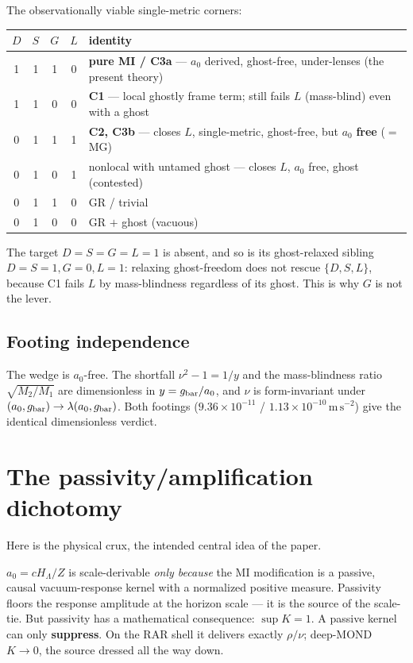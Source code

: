 \documentclass[11pt]{article}
\newcommand{\ms}{\mathrm{m\,s^{-2}}}
\newcommand{\gbar}{g_{\rm bar}}
\begin{document}
The observationally viable single-metric corners:
\begin{center}
\begin{tabular}{ccccl}
\toprule
$D$ & $S$ & $G$ & $L$ & identity\\
\midrule
1 & 1 & 1 & 0 & \textbf{pure MI / C3a} --- $a_0$ derived, ghost-free, under-lenses (the present theory)\\
1 & 1 & 0 & 0 & \textbf{C1} --- local ghostly frame term; still fails $L$ (mass-blind) even with a ghost\\
0 & 1 & 1 & 1 & \textbf{C2, C3b} --- closes $L$, single-metric, ghost-free, but $a_0$ \textbf{free} ($=$MG)\\
0 & 1 & 0 & 1 & nonlocal with untamed ghost --- closes $L$, $a_0$ free, ghost (contested)\\
0 & 1 & 1 & 0 & GR / trivial\\
0 & 1 & 0 & 0 & GR $+$ ghost (vacuous)\\
\bottomrule
\end{tabular}
\end{center}
The target $D=S=G=L=1$ is absent, and so is its ghost-relaxed sibling $D=S=1,G=0,L=1$: relaxing ghost-freedom does not rescue $\{D,S,L\}$, because C1 fails $L$ by mass-blindness regardless of its ghost. This is why $G$ is not the lever.

\subsection{Footing independence}

The wedge is $a_0$-free. The shortfall $\nu^2-1=1/y$ and the mass-blindness ratio $\sqrt{M_2/M_1}$ are dimensionless in $y=\gbar/a_0$, and $\nu$ is form-invariant under $(a_0,\gbar)\to\lambda(a_0,\gbar)$. Both footings ($9.36\times10^{-11}$ / $1.13\times10^{-10}\,\ms$) give the identical dimensionless verdict.

\section{The passivity/amplification dichotomy}\label{sec:dichotomy}

Here is the physical crux, the intended central idea of the paper.

$a_0=cH_\Lambda/Z$ is scale-derivable \emph{only because} the MI modification is a passive, causal vacuum-response kernel with a normalized positive measure. Passivity floors the response amplitude at the horizon scale --- it is the source of the scale-tie. But passivity has a mathematical consequence: $\sup K=1$. A passive kernel can only \textbf{suppress}. On the RAR shell it delivers exactly $\rho/\nu$; deep-MOND $K\to0$, the source dressed all the way down.
\end{document}

